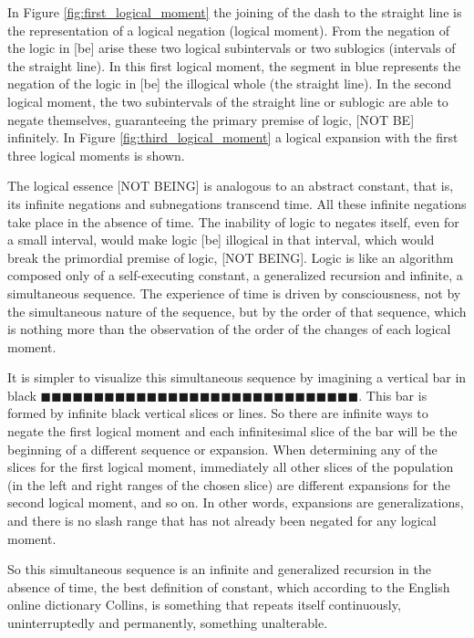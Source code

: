 In Figure \ref{fig:first_logical_moment} the joining of the dash to the straight line is the representation of a logical negation (logical moment). From the negation of the logic in [be] arise these two logical subintervals or two sublogics (intervals of the straight line). In this first logical moment, the segment in blue represents the negation of the logic in [be] the illogical whole (the straight line). In the second logical moment, the two subintervals of the straight line or sublogic are able to negate themselves, guaranteeing the primary premise of logic, [NOT BE] infinitely. In Figure \ref{fig:third_logical_moment} a logical expansion with the first three logical moments is shown.

The logical essence [NOT BEING] is analogous to an abstract constant, that is, its infinite negations and subnegations transcend time. All these infinite negations take place in the absence of time. The inability of logic to negates itself, even for a small interval, would make logic [be] illogical in that interval, which would break the primordial premise of logic, [NOT BEING]. Logic is like an algorithm composed only of a self-executing constant, a generalized recursion and infinite, a simultaneous sequence. The experience of time is driven by consciousness, not by the simultaneous nature of the sequence, but by the order of that sequence, which is nothing more than the observation of the order of the changes of each logical moment.

It is simpler to visualize this simultaneous sequence by imagining a vertical bar in black $\!\blacksquare\!\blacksquare\!\blacksquare\!\blacksquare\!\blacksquare\!\blacksquare\!\blacksquare\!\blacksquare\!\blacksquare\!\blacksquare\!\blacksquare\!\blacksquare\!\blacksquare\!\blacksquare\!\blacksquare\!\blacksquare\!\blacksquare\!\blacksquare\!\blacksquare\!\blacksquare\!\blacksquare\!\blacksquare\!\blacksquare\!\blacksquare\!\blacksquare\!\blacksquare\!\blacksquare\!\blacksquare\!\blacksquare\!\blacksquare$. This bar is formed by infinite black vertical slices or lines. So there are infinite ways to negate the first logical moment and each infinitesimal slice of the bar will be the beginning of a different sequence or expansion. When determining any of the slices for the first logical moment, immediately all other slices of the population (in the left and right ranges of the chosen slice) are different expansions for the second logical moment, and so on. In other words, expansions are generalizations, and there is no slash range that has not already been negated for any logical moment.

So this simultaneous sequence is an infinite and generalized recursion in the absence of time, the best definition of constant, which according to the English online dictionary Collins\cite{dic_constant}, is something that repeats itself continuously, uninterruptedly and permanently, something unalterable.







